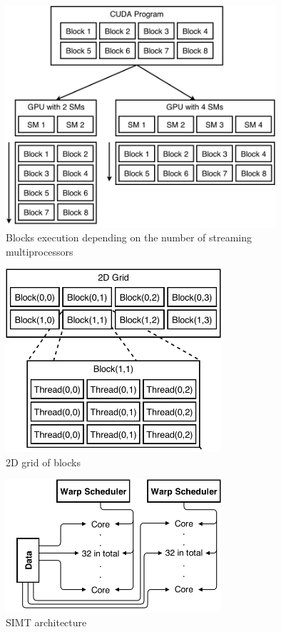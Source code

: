 \documentclass[10pt,a4paper]{report}
\begin{document}
\begin{figure}[h]
    \centering
    \includegraphics[width=10cm]{grid_scale.png}
    \caption{Blocks execution depending on the number of streaming multiprocessors}
    \label{fig:blocks_scaling}
\end{figure}

\begin{figure}[h]
    \centering
    \includegraphics[width=8cm]{2D_grid.png}
    \caption{2D grid of blocks}
    \label{fig:grid_2d}
\end{figure}

\newpage

\begin{figure}[h]
    \centering
    \includegraphics[width=8cm]{SIMT.png}
    \caption{SIMT architecture}
    \label{fig:SIMT}
\end{figure}
\end{document}
